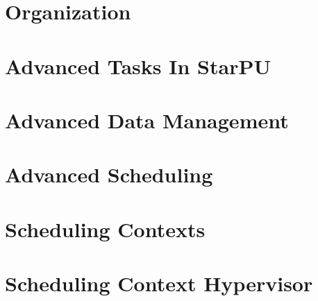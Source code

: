 %
%
%
%
%
\newcommand\starputitle{StarPU Handbook - StarPU Extensions}
\setcounter{tocdepth}{2}


\chapter{Organization}
\label{index}
\hypertarget{index}{}


\chapter{Advanced Tasks In StarPU}
\label{AdvancedTasksInStarPU}
\hypertarget{AdvancedTasksInStarPU}{}


\chapter{Advanced Data Management}
\label{AdvancedDataManagement}
\hypertarget{AdvancedDataManagement}{}


\chapter{Advanced Scheduling}
\label{AdvancedScheduling}
\hypertarget{AdvancedScheduling}{}


\chapter{Scheduling Contexts}
\label{SchedulingContexts}
\hypertarget{SchedulingContexts}{}


\chapter{Scheduling Context Hypervisor}
\label{SchedulingContextHypervisor}
\hypertarget{SchedulingContextHypervisor}{}


